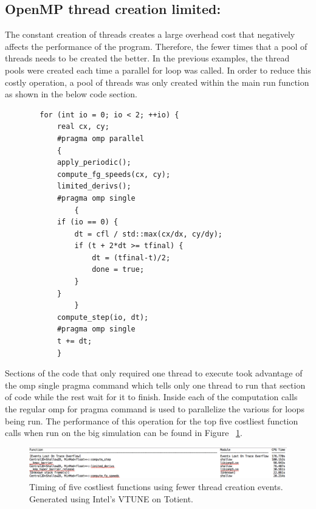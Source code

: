 \documentclass[12pt]{article}
\begin{document}
		\subsection{OpenMP thread creation limited:}
		
		The constant creation of threads creates a large overhead cost that negatively affects the performance of the program. Therefore, the fewer times that a pool of threads needs to be created the better. In the previous examples, the thread pools were created each time a parallel for loop was called. In order to reduce this costly operation, a pool of threads was only  created within the main run function as shown in the below code section.
		
		\begin{verbatim}
	    for (int io = 0; io < 2; ++io) {
            real cx, cy;
            #pragma omp parallel
            {
            apply_periodic();
            compute_fg_speeds(cx, cy);
            limited_derivs();
            #pragma omp single
                {
            if (io == 0) {
                dt = cfl / std::max(cx/dx, cy/dy);
                if (t + 2*dt >= tfinal) {
                    dt = (tfinal-t)/2;
                    done = true;
                }
            }
                }
            compute_step(io, dt);
            #pragma omp single
            t += dt;
            }

		\end{verbatim}
		
		\noindent Sections of the code that only required one thread to execute took advantage of the omp single pragma command which tells only one thread to run that section of code while the rest wait for it to finish. Inside each of the computation calls the regular omp for pragma command is used to parallelize the various for loops being run. The performance of this operation for the top five costliest function calls when run on the big simulation can be found in Figure ~\ref{ThreadMovement}.
		
		\begin{figure}[h!]
			\begin{center}
				\includegraphics[width=0.8\columnwidth]{ThreadMovement}
				\caption{Timing of five costliest functions using fewer thread creation events. Generated using Intel's VTUNE on Totient.}
				\label{ThreadMovement}
			\end{center}
		\end{figure}
		
\end{document}
